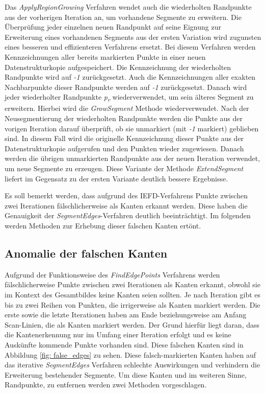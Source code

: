 Das \textit{ApplyRegionGrowing} Verfahren wendet auch die wiederholten Randpunkte aus der vorherigen Iteration an, um vorhandene Segmente zu erweitern. Die Überprüfung jeder einzelnen neuen Randpunkt auf seine Eignung zur Erweiterung eines vorhandenen Segments aus der ersten Variation wird zugunsten eines besseren und effizienteren Verfahrens ersetzt. Bei diesem Verfahren werden Kennzeichnungen aller bereits markierten Punkte in einer neuen Datenstrukturkopie aufgespeichert. Die Kennzeichnung der wiederholten Randpunkte wird auf \textit{-1} zurückgesetzt. Auch die Kennzeichnungen aller exakten Nachbarpunkte dieser Randpunkte werden auf \textit{-1} zurückgesetzt. Danach wird jeder wiederholter Randpunkte \textit{p\textsubscript{r}} wiederverwendet, um sein älteres Segment zu erweitern. Hierbei wird die \textit{GrowSegment} Methode wiederverwendet. Nach der Neusegmentierung der wiederholten Randpunkte werden die Punkte aus der vorigen Iteration darauf überprüft, ob sie unmarkiert (mit \textit{-1} markiert) geblieben sind. In diesem Fall wird die originelle Kennzeichnung dieser Punkte aus der Datenstrukturkopie aufgerufen und den Punkten wieder zugewiesen. Danach werden die übrigen unmarkierten Randpunkte aus der neuen Iteration verwendet, um neue Segmente zu erzeugen. Diese Variante der Methode \textit{ExtendSegment} liefert im Gegensatz zu der ersten Variante deutlich bessere Ergebnisse.

Es soll bemerkt werden, dass aufgrund des IEFD-Verfahrens Punkte zwischen zwei Iterationen fälschlicherweise als Kanten erkannt werden. Diese haben die Genauigkeit der \textit{SegmentEdges}-Verfahren deutlich beeinträchtigt. Im folgenden werden Methoden zur Erhebung dieser falschen Kanten ertönt.

\subsection{Anomalie der falschen Kanten} \label{false_edges}
Aufgrund der Funktionsweise des \textit{FindEdgePoints} Verfahrens werden fälschlicherweise Punkte zwischen zwei Iterationen als Kanten erkannt, obwohl sie im Kontext des Gesamtbildes keine Kanten seien sollten. Je nach Iteration gibt es bis zu zwei Reihen von Punkten, die irrigerweise als Kanten markiert werden. Die erste sowie die letzte Iterationen haben am Ende beziehungsweise am Anfang Scan-Linien, die als Kanten markiert werden. Der Grund hierfür liegt daran, dass die Kantenerkennung nur im Umfang einer Iteration erfolgt und es keine Auskünfte kommende Punkte vorhanden sind. Diese falschen Kanten sind in Abbildung \ref{fig: false_edges} zu sehen. Diese falsch-markierten Kanten haben auf das iterative \textit{SegmentEdges} Verfahren schlechte Auswirkungen und verhindern die Erweiterung bestehender Segmente. Um diese Kanten und im weiteren Sinne, Randpunkte, zu entfernen werden zwei Methoden vorgeschlagen.

